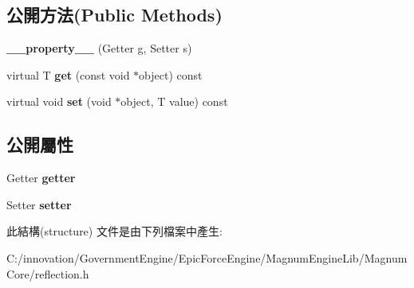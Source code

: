 \subsection*{公開方法(Public Methods)}
\begin{DoxyCompactItemize}
\item 
{\bfseries \+\_\+\+\_\+property\+\_\+\+\_\+} (Getter g, Setter s)\hypertarget{structagm_1_1reflection_1_1____property_____ae81596f5d1a1cb165847406fa2bbd66b}{}\label{structagm_1_1reflection_1_1____property_____ae81596f5d1a1cb165847406fa2bbd66b}

\item 
virtual T {\bfseries get} (const void $\ast$object) const \hypertarget{structagm_1_1reflection_1_1____property_____a3bfdd92184d1bd66f3885a95430f4311}{}\label{structagm_1_1reflection_1_1____property_____a3bfdd92184d1bd66f3885a95430f4311}

\item 
virtual void {\bfseries set} (void $\ast$object, T value) const \hypertarget{structagm_1_1reflection_1_1____property_____a1262bf07861e80bbfab72eab006d451d}{}\label{structagm_1_1reflection_1_1____property_____a1262bf07861e80bbfab72eab006d451d}

\end{DoxyCompactItemize}
\subsection*{公開屬性}
\begin{DoxyCompactItemize}
\item 
Getter {\bfseries getter}\hypertarget{structagm_1_1reflection_1_1____property_____a7095b883566f193f6ddadc6f790aee2f}{}\label{structagm_1_1reflection_1_1____property_____a7095b883566f193f6ddadc6f790aee2f}

\item 
Setter {\bfseries setter}\hypertarget{structagm_1_1reflection_1_1____property_____a40bd962fdf6debdb71c963b1c8cb7002}{}\label{structagm_1_1reflection_1_1____property_____a40bd962fdf6debdb71c963b1c8cb7002}

\end{DoxyCompactItemize}


此結構(structure) 文件是由下列檔案中產生\+:\begin{DoxyCompactItemize}
\item 
C\+:/innovation/\+Government\+Engine/\+Epic\+Force\+Engine/\+Magnum\+Engine\+Lib/\+Magnum\+Core/reflection.\+h\end{DoxyCompactItemize}

